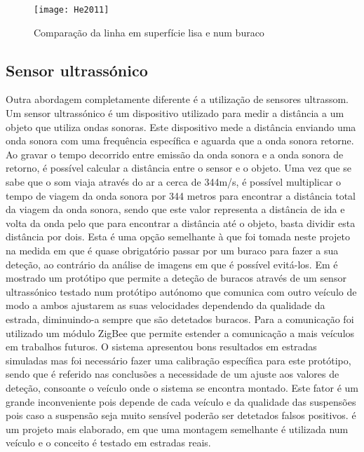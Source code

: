 \begin{figure}[htbp]
	\centering
	\texttt{[image: He2011]}
	\caption[Comparação da linha em superfície lisa e num buraco]{Comparação da linha em superfície lisa e num buraco \footnotemark}
	\label{fig:sensor_kinect}
\end{figure}
\vspace{5cm}

\subsection{Sensor ultrassónico}
\label{subsec:sensor_ultrassonico}
Outra abordagem completamente diferente é a utilização de sensores ultrassom.
Um sensor ultrassónico é um dispositivo utilizado para medir a distância a um objeto que utiliza ondas sonoras. Este dispositivo mede a distância enviando uma onda sonora com uma frequência específica e aguarda que a onda sonora retorne.
Ao gravar o tempo decorrido entre emissão da onda sonora e a onda sonora de retorno, é possível calcular a distância entre o sensor e o objeto.
Uma vez que se sabe que o som viaja através do ar a cerca de 344m/s, é possível multiplicar o tempo de viagem da onda sonora por 344 metros para encontrar a distância total da viagem da onda sonora, sendo que este valor representa a distância de ida e volta da onda pelo que para encontrar a distância até o objeto, basta dividir esta distância por dois.
Esta é uma opção semelhante à que foi tomada neste projeto na medida em que é quase obrigatório passar por um buraco para fazer a sua deteção, ao contrário da análise de imagens em que é possível evitá-los. 
Em \cite{Hegde2015} é mostrado um protótipo que permite a deteção de buracos através de um sensor ultrassónico testado num protótipo autónomo que comunica com outro veículo de modo a ambos ajustarem as suas velocidades dependendo da qualidade da estrada, diminuindo-a sempre que são detetados buracos.
Para a comunicação foi utilizado um módulo ZigBee que permite estender a comunicação a mais veículos em trabalhos futuros.
O sistema apresentou bons resultados em estradas simuladas mas foi necessário fazer uma calibração específica para este protótipo, sendo que é referido nas conclusões a necessidade de um ajuste aos valores de deteção, consoante o veículo onde o sistema se encontra montado.
Este fator é um grande inconveniente pois depende de cada veículo e da qualidade das suspensões pois caso a suspensão seja muito sensível poderão ser detetados falsos positivos.
\cite{Madli2015} é um projeto mais elaborado, em que uma montagem semelhante é utilizada num veículo e o conceito é testado em estradas reais.
